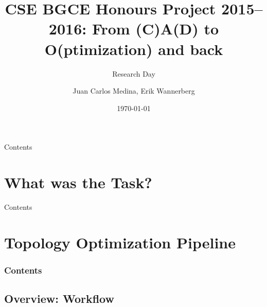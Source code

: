 ﻿\documentclass[9pt,pdftex]{beamer}
\title{CSE BGCE Honours Project 2015–2016: From (C)A(D) to O(ptimization) and back}
\subtitle{Research Day}
\author[J. Medina, E. Wannerberg] {
Juan Carlos Medina, Erik Wannerberg} %
\date{\today}
\institute{Technische Universität München}
\begin{document}
\frame{\maketitle}


\begin{frame}{Contents}
\setcounter{tocdepth}{1}
\tableofcontents
\end{frame}

\section{What was the Task?}








\begin{frame}{Contents}
\setcounter{tocdepth}{1}
\tableofcontents
\end{frame}



\section{Topology Optimization Pipeline}

  \begin{frame}
    \setcounter{tocdepth}{2}
  \frametitle{Contents}
  \tableofcontents[currentsection]
  \end{frame}

\subsection{Overview: Workflow}

\end{document}
